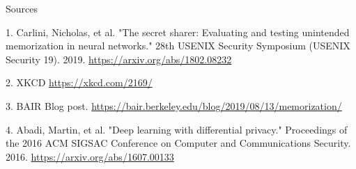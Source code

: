 \documentclass{beamer}
\begin{document}
\begin{frame}{Sources}
\begin{thebibliography}{0}

   1. Carlini, Nicholas, et al. "The secret sharer: Evaluating and testing unintended memorization in neural networks." 28th {USENIX} Security Symposium ({USENIX} Security 19). 2019. \url{https://arxiv.org/abs/1802.08232} 
  
   2. XKCD \url{https://xkcd.com/2169/}
  
   3. BAIR Blog post. \url{https://bair.berkeley.edu/blog/2019/08/13/memorization/}
  
   4. Abadi, Martin, et al. "Deep learning with differential privacy." Proceedings of the 2016 ACM SIGSAC Conference on Computer and Communications Security. 2016. \url{https://arxiv.org/abs/1607.00133}
  
\end{thebibliography}

\end{frame}

 
\end{document}

